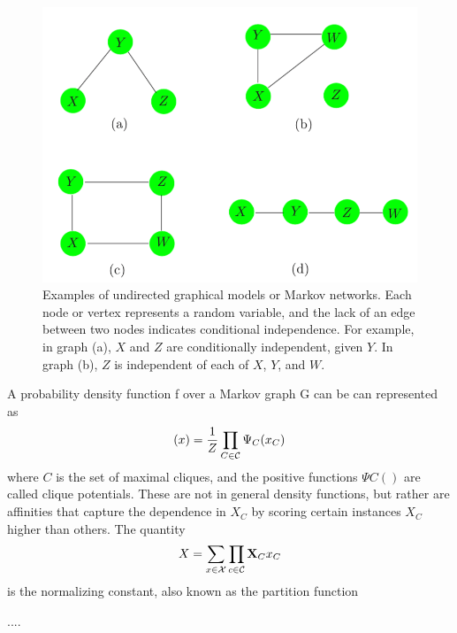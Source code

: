 \documentclass[12pt, letterpaper]{article}
\theoremstyle{definition}
\newcommand{\X}{\mathrm{\mathbf{X}}}
\begin{document}
\begin{figure}
\centering
\includegraphics[scale=0.45]{img/graphs}
\caption{Examples of undirected graphical models or Markov networks. Each node or vertex represents a random variable, and the lack of an edge between two nodes indicates conditional independence. For example, in graph (a), $X$ and $Z$ are conditionally independent, given $Y$. In graph (b), $Z$ is independent of each of $X$, $Y$, and $W$.}
\label{graphs}
\end{figure}
A probability density function f over a Markov graph G can be can represented as
\begin{equation}
(x) = \frac{1}{Z} \prod_{C \in \CMcal{C}} \Psi_C (x_C)
\end{equation}
where $C$ is the set of maximal cliques, and the positive functions $\Psi C()$ are called clique potentials.  These are not in general density functions, but rather are affinities that capture the dependence in $X_C$ by scoring certain instances $X_C$ higher than others. The quantity
\begin{equation}
X = \sum_{x \in \CMcal{X}} \prod_{c \in \CMcal{C}} \X_C{x_C}
\end{equation}
is the normalizing constant, also known as the partition function

....


\printindex
\end{document}
